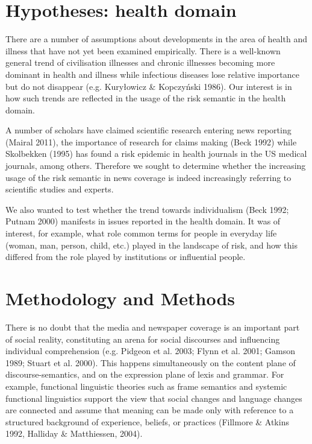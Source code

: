 \section{Hypotheses: health domain}

There are a number of assumptions about developments in the area of health and illness that have not yet been examined empirically. There is a well-known general trend of civilisation illnesses and chronic illnesses becoming more dominant in health and illness while infectious diseases lose relative importance but do not disappear (e.g. Kury\l{}owicz \& Kopczy\'{n}ski 1986). Our interest is in how such trends are reflected in the usage of the risk semantic in the health domain.

A number of scholars have claimed scientific research entering news reporting (Mairal 2011), the importance of research for claims making (Beck 1992) while Skolbekken (1995) has found a risk epidemic in health journals in the US medical journals, among others. Therefore we sought to determine whether the increasing usage of the risk semantic in news coverage is indeed increasingly referring to scientific studies and experts.

We also wanted to test whether the trend towards individualism (Beck 1992; Putnam 2000) manifests in issues reported in the health domain. It was of interest, for example, what role common terms for people in everyday life (woman, man, person, child, etc.) played in the landscape of risk, and how this differed from the role played by institutions or influential people.

\section{Methodology and Methods}

There is no doubt that the media and newspaper coverage is an important part of social reality, constituting an arena for social discourses and influencing individual comprehension (e.g. Pidgeon et al. 2003; Flynn et al. 2001; Gamson 1989; Stuart et al. 2000). This happens simultaneously on the content plane of discourse-semantics, and on the expression plane of lexis and grammar. For example, functional linguistic theories such as frame semantics and systemic functional linguistics support the view that social changes and language changes are connected and assume that meaning can be made only with reference to a structured background of experience, beliefs, or practices (Fillmore \& Atkins 1992, Halliday \& Matthiessen, 2004). 

